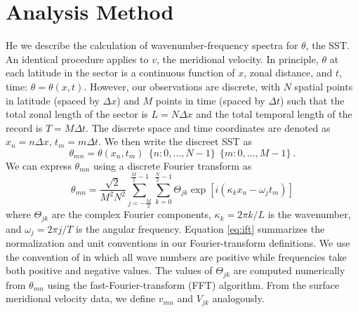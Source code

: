 \documentclass[10pt]{article}
\begin{document}
\section{Analysis Method}

He we describe the calculation of wavenumber-frequency spectra for $\theta$, the SST. An identical procedure applies to $v$, the meridional velocity. In principle, $\theta$ at each latitude in the sector is a continuous function of $x$, zonal distance, and $t$, time: $\theta = \theta(x,t)$. However, our observations are discrete, with $N$ spatial points in latitude (spaced by $\Delta x$) and $M$ points in time (spaced by $\Delta t$) such that the total zonal length of the sector is $L = N \Delta x$ and the total temporal length of the record is $T = M \Delta t$. The discrete space and time coordinates are denoted as $x_n = n \Delta x$, $t_m = m \Delta t$. We then write the discreet SST as
\begin{equation}
\theta_{mn} = \theta( x_n, t_m ) \ \ \{n: 0, ..., N-1\} \ \ \{m: 0, ..., M-1\} \ .
\end{equation}
We can express $\theta_{mn}$ using a discrete Fourier transform as
\begin{equation}
\theta_{mn} = \frac{\sqrt{2}}{M^2 N^2} \sum_{j=-\frac{M}{2}}^{\frac{M}{2}-1} \sum_{k=0}^{\frac{N}{2}-1} \Theta_{jk} \exp[ i (\kappa_k x_n - \omega_j t_m ) ] 
\label{eq:ift}
\end{equation}
where $\Theta_{jk}$ are the complex Fourier components, $\kappa_k = 2 \pi k / L$ is the wavenumber, and $\omega_j = 2 \pi j / T$ is the   angular frequency. %
Equation \eqref{eq:ift} summarizes the normalization and unit conventions in our Fourier-transform definitions.
We use the convention of \citet{RandelHeld1991} in which all wave numbers are positive while frequencies take both positive and negative values.  
The values of $\Theta_{jk}$ are computed numerically from $\theta_{mn}$ using the fast-Fourier-transform (FFT) algorithm. From the surface meridional velocity data, we define $v_{mn}$ and $V_{jk}$ analogously.
\end{document}

